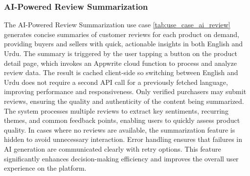 \subsubsection{AI-Powered Review Summarization}
The AI-Powered Review Summarization use case \ref{tab:use_case_ai_review} generates concise summaries of customer reviews for each product on demand, providing buyers and sellers with quick, actionable insights in both English and Urdu. The summary is triggered by the user tapping a button on the product detail page, which invokes an Appwrite cloud function to process and analyze review data. The result is cached client-side so switching between English and Urdu does not require a second API call for a previously fetched language, improving performance and responsiveness. Only verified purchasers may submit reviews, ensuring the quality and authenticity of the content being summarized. The system processes multiple reviews to extract key sentiments, recurring themes, and common feedback points, enabling users to quickly assess product quality. In cases where no reviews are available, the summarization feature is hidden to avoid unnecessary interaction. Error handling ensures that failures in AI generation are communicated clearly with retry options. This feature significantly enhances decision-making efficiency and improves the overall user experience on the platform.

